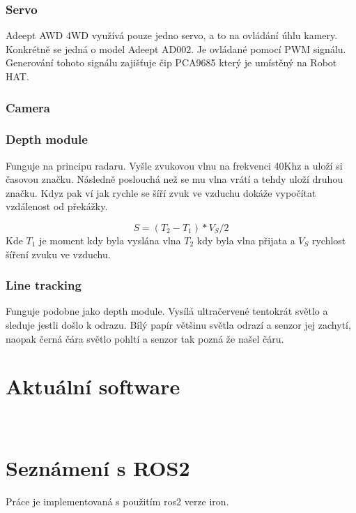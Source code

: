 \subsubsection*{Servo}
Adeept AWD 4WD využívá pouze jedno servo, a to na ovládání úhlu kamery. Konkrétně se jedná o model Adeept AD002. Je ovládané pomocí PWM signálu. Generování tohoto signálu zajišťuje čip PCA9685 který je umístěný na Robot HAT.

\subsubsection*{Camera}

\subsubsection*{Depth module}
Funguje na principu radaru. Vyšle zvukovou vlnu na frekvenci 40Khz %
 a uloží si časovou značku. Následně poslouchá než se mu vlna vrátí a tehdy uloží druhou značku. Kdyz pak ví jak rychle se šíří zvuk ve vzduchu dokáže vypočítat vzdálenost od překážky.

$$S = (T_2 - T_1) * V_S / 2$$
Kde $T_1$ je moment kdy byla vyslána vlna $T_2$ kdy byla vlna přijata a $V_S$ rychlost šíření zvuku ve vzduchu.

\subsubsection*{Line tracking}
Funguje podobne jako depth module. Vysílá ultračervené tentokrát světlo a sleduje jestli došlo k odrazu. Bílý papír většinu světla odrazí a senzor jej zachytí, naopak černá čára světlo pohltí a senzor tak pozná že našel čáru.

\section{Aktuální software}


\



\section{Seznámení s ROS2}
Práce je implementovaná s použitím ros2 verze iron.

